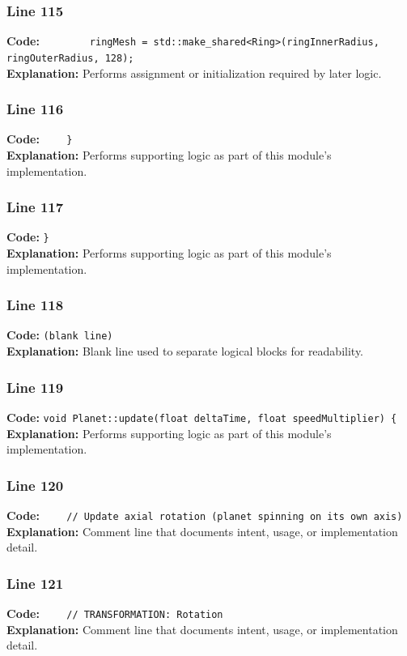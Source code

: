 \documentclass[11pt,a4paper]{article}
\begin{document}
\subsubsection*{Line 115}
\textbf{Code:} \verb|        ringMesh = std::make_shared<Ring>(ringInnerRadius, ringOuterRadius, 128);|\\
\textbf{Explanation:} Performs assignment or initialization required by later logic.

\subsubsection*{Line 116}
\textbf{Code:} \verb|    }|\\
\textbf{Explanation:} Performs supporting logic as part of this module's implementation.

\subsubsection*{Line 117}
\textbf{Code:} \verb|}|\\
\textbf{Explanation:} Performs supporting logic as part of this module's implementation.

\subsubsection*{Line 118}
\textbf{Code:} \texttt{(blank line)}\\
\textbf{Explanation:} Blank line used to separate logical blocks for readability.

\subsubsection*{Line 119}
\textbf{Code:} \verb|void Planet::update(float deltaTime, float speedMultiplier) {|\\
\textbf{Explanation:} Performs supporting logic as part of this module's implementation.

\subsubsection*{Line 120}
\textbf{Code:} \verb|    // Update axial rotation (planet spinning on its own axis)|\\
\textbf{Explanation:} Comment line that documents intent, usage, or implementation detail.

\subsubsection*{Line 121}
\textbf{Code:} \verb|    // TRANSFORMATION: Rotation|\\
\textbf{Explanation:} Comment line that documents intent, usage, or implementation detail.
\end{document}
